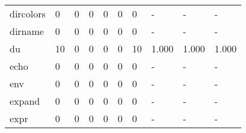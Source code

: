 \begin{longtable}{lp{1.3cm}p{1.3cm}p{1.3cm}p{1.3cm}p{1.3cm}p{1.3cm}p{1.3cm}p{1.3cm}p{1.3cm}}
dircolors &                      0 &                                  0 &                                 0 &                                0 &                                 0 &                               0 &                                    - &                                      - &                                    - \\
dirname   &                      0 &                                  0 &                                 0 &                                0 &                                 0 &                               0 &                                    - &                                      - &                                    - \\
du        &                     10 &                                  0 &                                 0 &                                0 &                                 0 &                              10 &                                1.000 &                                  1.000 &                                1.000 \\
echo      &                      0 &                                  0 &                                 0 &                                0 &                                 0 &                               0 &                                    - &                                      - &                                    - \\
env       &                      0 &                                  0 &                                 0 &                                0 &                                 0 &                               0 &                                    - &                                      - &                                    - \\
expand    &                      0 &                                  0 &                                 0 &                                0 &                                 0 &                               0 &                                    - &                                      - &                                    - \\
expr      &                      0 &                                  0 &                                 0 &                                0 &                                 0 &                               0 &                                    - &                                      - &                                    - \\

\end{longtable}
